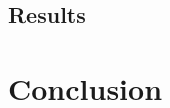 \documentclass[sigconf]{acmart}
\begin{document}
\subsection{Results}

\section{Conclusion}



\end{document}
